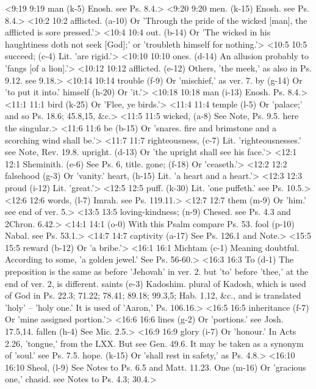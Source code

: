 <9:19 9:19  man (k-5) Enosh. see Ps. 8.4.>
<9:20 9:20  men. (k-15)  Enosh. see Ps. 8.4.>
<10:2 10:2  afflicted. (a-10)  Or 'Through the pride of the wicked [man], the afflicted is  sore pressed.'>
<10:4 10:4  out. (b-14)  Or 'The wicked in his haughtiness doth not seek [God];' or  'troubleth himself for nothing.'>
<10:5 10:5  succeed; (c-4)  Lit. 'are rigid.'>
<10:10 10:10  ones. (d-14)  An allusion probably to 'fangs [of a lion].'>
<10:12 10:12  afflicted. (e-12)  Others, 'the meek,' as also in Ps. 9.12. see 9.18.>
<10:14 10:14  trouble (f-9)  Or 'mischief,' as ver. 7.
  by (g-14)  Or 'to put it into.'
  himself (h-20)  Or 'it.'>
<10:18 10:18  man (i-13)  Enosh. Ps. 8.4.>
<11:1 11:1  bird (k-25)  Or 'Flee, ye birds.'>
<11:4 11:4  temple (l-5)  Or 'palace;' and so Ps. 18.6; 45.8,15, &c.>
<11:5 11:5  wicked, (a-8)  See Note, Ps. 9.5. here the singular.>
<11:6 11:6  be (b-15)  Or 'snares. fire and brimstone and a scorching wind shall  be.'>
<11:7 11:7  righteousness, (c-7)  Lit. 'righteousnesses.' see Note, Rev. 19.8.
  upright. (d-13)  Or 'the upright shall see his face.'>
<12:1 12:1  Sheminith. (e-6)  See Ps. 6, title.
  gone; (f-18)  Or 'ceaseth.'>
<12:2 12:2  falsehood (g-3)  Or 'vanity.'
  heart, (h-15)  Lit. 'a heart and a heart.'>
<12:3 12:3  proud (i-12)  Lit. 'great.'>
<12:5 12:5  puff. (k-30)  Lit. 'one puffeth.' see Ps. 10.5.>
<12:6 12:6  words, (l-7)  Imrah. see Ps. 119.11.>
<12:7 12:7  them (m-9)  Or 'him.' see end of ver. 5.>
<13:5 13:5  loving-kindness; (n-9)  Chesed. see Ps. 4.3 and 2Chron. 6.42.>
<14:1 14:1   (o-0)  With this Psalm compare Ps. 53.
  fool (p-10)  Nabal. see Ps. 53.1.>
<14:7 14:7  captivity (a-17)  See Ps. 126.1 and Note.>
<15:5 15:5  reward (b-12)  Or 'a bribe.'>
<16:1 16:1  Michtam (c-1)  Meaning doubtful. According to some, 'a golden jewel.' See  Ps. 56-60.>
<16:3 16:3  To (d-1)  The preposition is the same as before 'Jehovah' in ver. 2.  but 'to' before 'thee,' at the end of ver. 2, is different.
  saints (e-3)  Kadoshim. plural of Kadosh, which is used of God in Ps.  22.3; 71.22; 78.41; 89.18; 99.3,5; Hab. 1.12, &c., and is  translated 'holy' -- 'holy one.' It is used of 'Aaron,' Ps. 106.16.>
<16:5 16:5  inheritance (f-7)  Or 'mine assigned portion.'>
<16:6 16:6  lines (g-2)  Or 'portions.' see Josh. 17.5,14.
  fallen (h-4)  See Mic. 2.5.>
<16:9 16:9  glory (i-7)  Or 'honour.' In Acts 2.26, 'tongue,' from the LXX. But see  Gen. 49.6. It may be taken as a synonym of 'soul.' see Ps. 7.5.
  hope. (k-15)  Or 'shall rest in safety,' as Ps. 4.8.>
<16:10 16:10  Sheol, (l-9)  See Notes to Ps. 6.5 and Matt. 11.23.
  One (m-16)  Or 'gracious one,' chasid. see Notes to Ps. 4.3; 30.4.>
